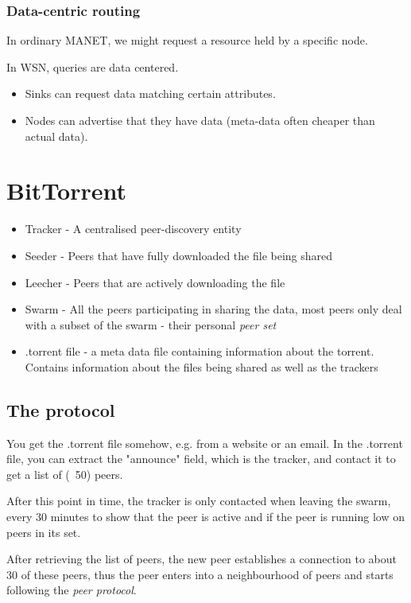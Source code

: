 	\subsection{Data-centric routing}
	In ordinary \gls{MANET}, we might request a resource held by a specific node.
	
	In WSN, queries are data centered.
	\begin{itemize}
		\item Sinks can request data matching certain attributes.
		\item Nodes can advertise that they have data (meta-data often cheaper than actual data).
	\end{itemize}
	
	\chapter{BitTorrent}
	\begin{itemize}
		\item Tracker - A centralised peer-discovery entity
		\item Seeder - Peers that have fully downloaded the file being shared
		\item Leecher - Peers that are actively downloading the file
		\item Swarm - All the peers participating in sharing the data, most peers only deal with a subset of the swarm - their personal \textit{peer set}
		\item .torrent file - a meta data file containing information about the torrent. Contains information about the files being shared as well as the trackers
	\end{itemize}
	
	\section{The protocol}
	You get the .torrent file somehow, e.g. from a website or an email. In the .torrent file, you can extract the "announce" field, which is the tracker, and contact it to get a list of (~50) peers.
	
	After this point in time, the tracker is only contacted when leaving the swarm, every 30 minutes to show that the peer is active and if the peer is running low on peers in its set.
	
	After retrieving the list of peers, the new peer establishes a connection to about 30 of these peers, thus the peer enters into a neighbourhood of peers and starts following the \textit{peer protocol}.
	
